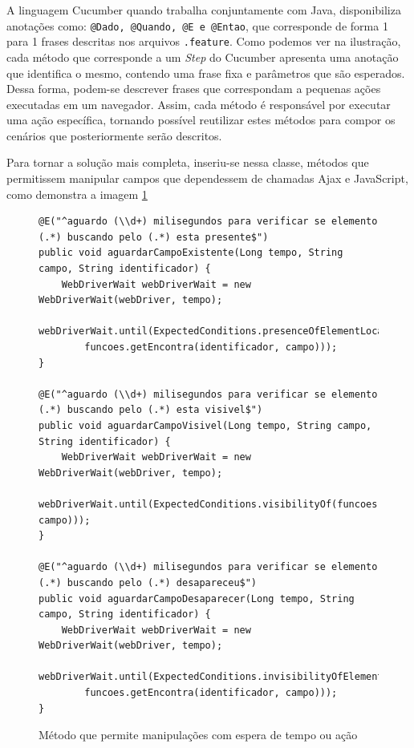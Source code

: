 \documentclass[tg]{mdtufsm}
\begin{document}
A linguagem Cucumber quando trabalha conjuntamente com Java, disponibiliza anotações como: \texttt{@Dado, @Quando, @E e @Entao}, que corresponde de forma 1 para 1 frases descritas nos arquivos \texttt{.feature}.
Como podemos ver na ilustração, cada método que corresponde a um \emph{Step} do Cucumber apresenta uma anotação que identifica o mesmo, contendo uma frase fixa e parâmetros que são esperados. Dessa forma, podem-se descrever frases que correspondam a pequenas ações executadas em um navegador. Assim, cada método é responsável por executar uma ação específica, tornando possível reutilizar estes métodos para compor os cenários que posteriormente serão descritos.

Para tornar a solução mais completa, inseriu-se nessa classe, métodos que permitissem manipular campos que dependessem de chamadas Ajax e JavaScript, como demonstra a imagem \ref{code:Método WebDriverWait}

\begin{figure}[!htt]
	\begin{lstlisting}
@E("^aguardo (\\d+) milisegundos para verificar se elemento (.*) buscando pelo (.*) esta presente$")
public void aguardarCampoExistente(Long tempo, String campo, String identificador) {
    WebDriverWait webDriverWait = new WebDriverWait(webDriver, tempo);
    webDriverWait.until(ExpectedConditions.presenceOfElementLocated(
        funcoes.getEncontra(identificador, campo)));
}

@E("^aguardo (\\d+) milisegundos para verificar se elemento (.*) buscando pelo (.*) esta visivel$")
public void aguardarCampoVisivel(Long tempo, String campo, String identificador) {
    WebDriverWait webDriverWait = new WebDriverWait(webDriver, tempo);
    webDriverWait.until(ExpectedConditions.visibilityOf(funcoes.getEncontraCampo(identificador, campo)));
}

@E("^aguardo (\\d+) milisegundos para verificar se elemento (.*) buscando pelo (.*) desapareceu$")
public void aguardarCampoDesaparecer(Long tempo, String campo, String identificador) {
    WebDriverWait webDriverWait = new WebDriverWait(webDriver, tempo);
    webDriverWait.until(ExpectedConditions.invisibilityOfElementLocated(
        funcoes.getEncontra(identificador, campo)));
}
	\end{lstlisting}
	\caption{Método que permite manipulações com espera de tempo ou ação}
	\label{code:Método WebDriverWait}
\end{figure}
\end{document}
